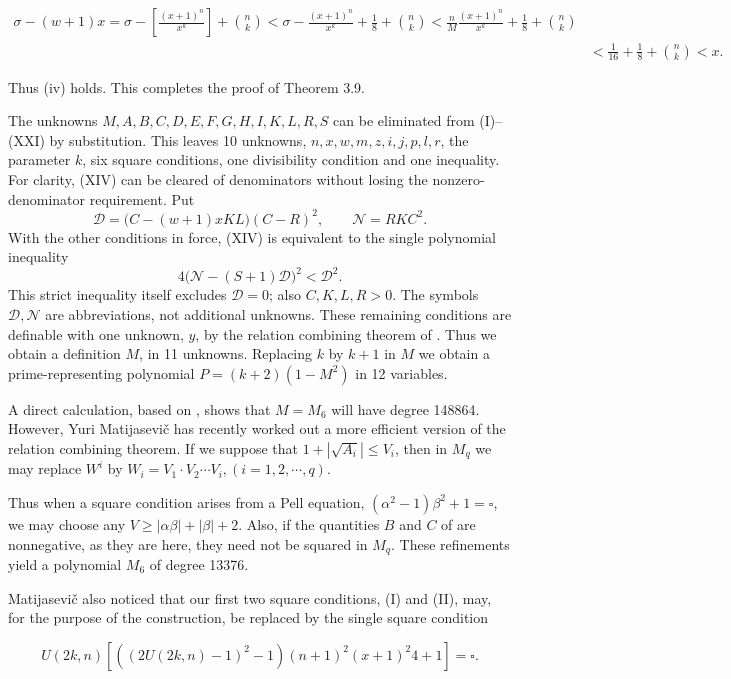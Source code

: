 \documentclass[10pt,letterpaper]{article}
\newcommand{\origpage}[1]{\marginnote{\footnotesize\textbf{[#1]}}}
\begin{document}
\[
\begin{aligned}
\sigma-(w+1) x=\sigma-\left[\frac{(x+1)^{n}}{x^{k}}\right]+\binom{n}{k}<\sigma-\frac{(x+1)^{n}}{x^{k}}+\frac{1}{8}+\binom{n}{k}<\frac{n}{M} \frac{(x+1)^{n}}{x^{k}}+\frac{1}{8}+\binom{n}{k} & \\
& <\frac{1}{16}+\frac{1}{8}+\binom{n}{k}<x .
\end{aligned}
\]

Thus (iv) holds. This completes the proof of Theorem 3.9.

The unknowns $M,A,B,C,D,E,F,G,H,I,K,L,R,S$ can be eliminated from (I)--(XXI) by substitution. This leaves 10 unknowns, $n, x, w, m, z, i, j, p, l, r$, the parameter $k$, six square conditions, one divisibility condition and one inequality. For clarity, (XIV) can be cleared of denominators without losing the nonzero-denominator requirement.
Put
\[
\mathcal D=\bigl(C-(w+1)xKL\bigr)(C-R)^2,\qquad
\mathcal N=RKC^2.
\]
With the other conditions in force, (XIV) is equivalent to the single polynomial inequality
\[
4\bigl(\mathcal N-(S+1)\mathcal D\bigr)^2<\mathcal D^2.
\]
This strict inequality itself excludes $\mathcal D=0$; also $C,K,L,R>0$.
The symbols $\mathcal D,\mathcal N$ are abbreviations, not additional unknowns.
These remaining conditions are definable with one unknown, $y$, by the relation combining theorem of \cite{ref11}. Thus we obtain a definition $M$, in 11 unknowns. Replacing $k$ by $k+1$ in $M$ we obtain a prime-representing polynomial $P=(k+2)\left(1-M^{2}\right)$ in 12 variables.

A direct calculation, based on \cite{ref11}, shows that $M=M_{6}$ will have degree 148864. However, Yuri Matijasevič has recently worked out a more efficient version of the relation combining theorem. If we suppose that $1+\left|\sqrt{A_{i}}\right| \leq V_{i}$, then in $M_{q}$ we may replace $W^{i}$ by $W_{i}=V_{1} \cdot V_{2} \cdots V_{i},(i=1,2, \cdots, q)$.

\origpage{462}Thus when a square condition arises from a Pell equation, $\left(\alpha^{2}-1\right) \beta^{2}+1=\square$, we may choose any $V \geq|\alpha \beta|+|\beta|+2$. Also, if the quantities $B$ and $C$ of \cite{ref11} are nonnegative, as they are here, they need not be squared in $M_{q}$. These refinements yield a polynomial $M_{6}$ of degree 13376.

Matijasevič also noticed that our first two square conditions, (I) and (II), may, for the purpose of the construction, be replaced by the single square condition


\begin{equation*}
U(2 k, n)\left[\left((2 U(2 k, n)-1)^{2}-1\right)(n+1)^{2}(x+1)^{2} 4+1\right]=\square . \tag{24}
\end{equation*}
\end{document}
